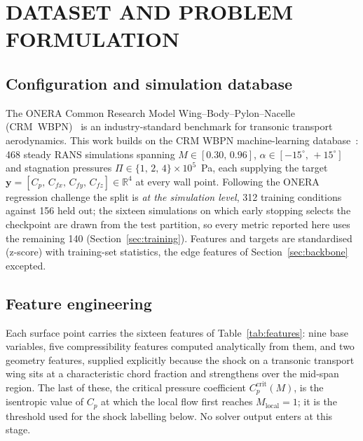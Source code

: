 \documentclass{WCCM-ECCOMAS_2026_Full_Paper}
\begin{document}
\section{DATASET AND PROBLEM FORMULATION}
\label{sec:dataset}

\subsection{Configuration and simulation database}

The ONERA Common Research Model Wing--Body--Pylon--Nacelle
(CRM~WBPN)~\cite{Vassberg2008,Levy2013} is an industry-standard
benchmark for transonic transport aerodynamics.  This work builds on
the CRM WBPN machine-learning database~\cite{Peter2025}: 468 steady
RANS simulations spanning $M \in [0.30,\,0.96]$,
$\alpha \in [-15^{\circ},\,+15^{\circ}]$ and stagnation pressures
$\Pi \in \{1,\,2,\,4\}\times 10^{5}$~Pa, each supplying the target
$\mathbf{y} = [C_p,\,C_{fx},\,C_{fy},\,C_{fz}] \in \mathbb{R}^{4}$ at
every wall point.  Following the ONERA regression challenge the split
is \emph{at the simulation level}, 312 training conditions against 156
held out; the sixteen simulations on which early stopping selects the
checkpoint are drawn from the test partition, so every metric reported
here uses the remaining 140 (Section~\ref{sec:training}).  Features
and targets are standardised (z-score) with training-set statistics,
the edge features of Section~\ref{sec:backbone} excepted.

\subsection{Feature engineering}

Each surface point carries the sixteen features of
Table~\ref{tab:features}: nine base variables, five compressibility
features computed analytically from them, and two geometry features,
supplied explicitly because the shock on a transonic transport wing
sits at a characteristic chord fraction and strengthens over the
mid-span region.  The last of these, the critical pressure coefficient
$C_{p}^{\mathrm{crit}}(M)$, is the isentropic value of $C_p$ at which
the local flow first reaches $M_{\mathrm{local}}=1$; it is the
threshold used for the shock labelling below.  No solver output enters
at this stage.
\end{document}
